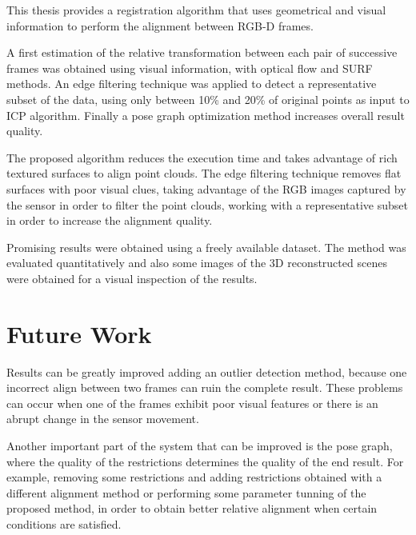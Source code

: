 

This thesis provides a registration algorithm that uses geometrical and visual information 
to perform the alignment between RGB-D frames.  

A first estimation of the relative transformation between each pair of successive frames was obtained using 
visual information, with optical flow and SURF methods. An edge filtering technique was applied to detect a representative subset 
of the data, using only between 10\% and 20\% of original points as input to ICP algorithm. Finally a pose graph optimization method increases overall result quality.

The proposed algorithm reduces the execution time and takes advantage of rich textured surfaces to align point clouds. The edge filtering technique removes flat surfaces with poor visual clues, taking advantage of the RGB images captured by the sensor in order to filter the point clouds, working with a representative subset in order to increase the alignment quality.


Promising results were obtained using a freely available dataset. The method was evaluated quantitatively and 
also some images of the 3D reconstructed scenes were obtained for a visual inspection of the results.

\section{Future Work}

  Results can be greatly improved adding an outlier detection method, because one incorrect align between two frames can ruin the complete result. These problems can occur 
when one of the frames exhibit poor visual features or there is an abrupt change in the sensor movement. 

  Another important part of the system that can be improved is the pose graph, where the quality of the restrictions 
determines the quality of the end result. For example, removing some restrictions and adding restrictions obtained with a 
different alignment method or performing some parameter tunning of the proposed method, in 
order to obtain better relative alignment when certain conditions are satisfied.


